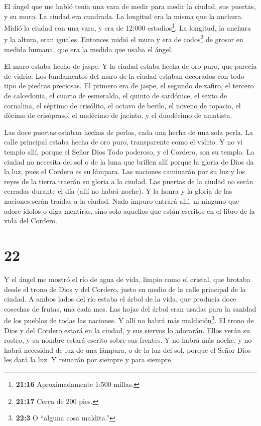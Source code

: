  El ángel que me habló tenía una vara de medir para medir
la ciudad, sus puertas, y su muro.  La ciudad era cuadrada.
La longitud era la misma que la anchura. Midió la ciudad con una vara, y
era de 12:000 estadios\footnote{\textbf{21:16} Aproximadamente 1:500
  millas.}. La longitud, la anchura y la altura, eran iguales.
 Entonces midió el muro y era de codos\footnote{\textbf{21:17}
  Cerca de 200 pies.} de grosor en medida humana, que era la medida que
usaba el ángel.

 El muro estaba hecho de jaspe. Y la ciudad estaba hecha de
oro puro, que parecía de vidrio.  Los fundamentos del muro
de la ciudad estaban decorados con todo tipo de piedras preciosas. El
primero era de jaspe, el segundo de zafiro, el tercero de calcedonia, el
cuarto de esmeralda,  el quinto de sardónice, el sexto de
cornalina, el séptimo de crisólito, el octavo de berilo, el noveno de
topacio, el décimo de crisópraso, el undécimo de jacinto, y el duodécimo
de amatista.

 Las doce puertas estaban hechas de perlas, cada una hecha
de una sola perla. La calle principal estaba hecha de oro puro,
transparente como el vidrio.  Y no vi templo allí, porque
el Señor Dios Todo poderoso, y el Cordero, son su templo. 
La ciudad no necesita del sol o de la luna que brillen allí porque la
gloria de Dios da la luz, pues el Cordero es su lámpara. 
Las naciones caminarán por su luz y los reyes de la tierra traerán su
gloria a la ciudad.  Las puertas de la ciudad no serán
cerradas durante el día (allí no habrá noche).  Y la honra
y la gloria de las naciones serán traídas a la ciudad. 
Nada impuro entrará allí, ni ninguno que adore ídolos o diga mentiras,
sino solo aquellos que están escritos en el libro de la vida del
Cordero.

\hypertarget{section-21}{%
\section{22}\label{section-21}}

 Y el ángel me mostró el río de agua de vida, limpio como el
cristal, que brotaba desde el trono de Dios y del Cordero, 
justo en medio de la calle principal de la ciudad. A ambos lados del río
estaba el árbol de la vida, que producía doce cosechas de frutas, una
cada mes. Las hojas del árbol eran usadas para la sanidad de los pueblos
de todas las naciones.  Y allí no habrá más
maldición\footnote{\textbf{22:3} O ``alguna cosa maldita.''}. El trono
de Dios y del Cordero estará en la ciudad, y sus siervos lo adorarán.
 Ellos verán su rostro, y su nombre estará escrito sobre sus
frentes.  Y no habrá más noche, y no habrá necesidad de luz
de una lámpara, o de la luz del sol, porque el Señor Dios les dará la
luz. Y reinarán por siempre y para siempre.

